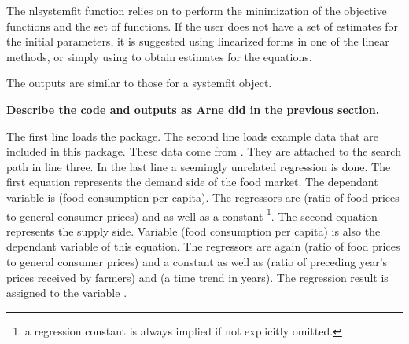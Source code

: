 \documentclass[article]{jss}
\begin{document}


The nlsystemfit function relies on  to perform the
minimization of the objective functions and the  set of
functions. If the user does not have a set of estimates for the
initial parameters, it is suggested using linearized forms in one of
the linear methods, or simply using  to obtain estimates for
the equations. 

The outputs are similar to those for a systemfit object. 

\textbf{Describe the code and outputs as Arne did in the previous
  section.}

The first line loads the  package. 
The second line loads example data that are included in this package.
These data come from \cite{kmenta86}.
They are attached to the  search path in line three.
In the last line a seemingly unrelated regression is done.
The first equation represents the demand side of the food market.
The dependant variable is  (food consumption per capita). 
The regressors are  (ratio of food prices to general consumer prices)
and  as well as a constant%
\footnote{a regression constant is always implied if not explicitly omitted.}.
The second equation represents the supply side.
Variable  (food consumption per capita) is also the dependant 
variable of this equation. 
The regressors are again  (ratio of food prices to general 
consumer prices) and a constant as well as 
 (ratio of preceding year's prices received by farmers) and 
 (a time trend in years).
The regression result is assigned to the variable .
\end{document}
